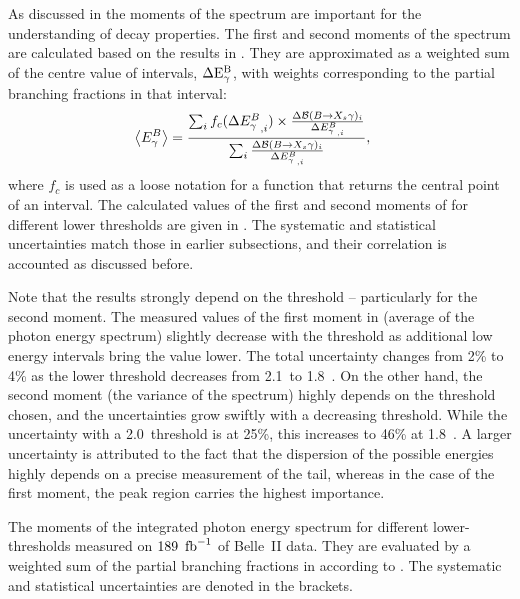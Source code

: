 As discussed in  the moments of the \BtoXsgamma
spectrum are important for the understanding of \BtoXsgamma decay properties.
The first and second moments of the \BtoXsgamma spectrum are calculated based on the results in .
They are approximated as a weighted sum of the centre value of \EB intervals, $\mathrm{\Delta{\ensuremath{E^B_{\gamma}}}}$,
with weights corresponding to the partial branching fractions in that \EB interval:
\begin{align}\label{eq:weighted_sum_moments}
    \begin{split}
        \expval{\EB} &= \frac{\sum_i f_c(\Delta\EB^{}_{,i})\times  
                               \frac{\Delta\mathcal{B}(\BtoXsgamma)_i}
                                    {\Delta {E^B_{\g}}_{,i}}}
                             {\sum_i \frac{\Delta\mathcal{B}(\BtoXsgamma)_i}{\Delta {E^B_{\g}}_{,i}}},
    \end{split}
\end{align} 
where $f_c$ is used as a loose notation for a function that returns the central point of an interval.
The calculated values of the first and second moments of \EB for different lower thresholds are given in .
The systematic and statistical uncertainties match those in earlier subsections, and their correlation is accounted as discussed before.

Note that the results strongly depend on the threshold -- particularly for the second moment.
The measured values of the first moment in  (average of the photon energy spectrum) slightly decrease with the \EB threshold as additional
low energy \EB intervals bring the value lower.
The total uncertainty changes from 2\% to 4\% as the \EB lower threshold decreases from 2.1~\gev to 1.8~\gev.
On the other hand, the second moment (the variance of the spectrum) highly depends on the threshold chosen, 
and the uncertainties grow swiftly with a decreasing \EB threshold.
While the uncertainty with a 2.0~\gev \EB threshold is at 25\%, this increases to 46\% at 1.8~\gev.
A larger uncertainty is attributed to the fact that the dispersion of the possible \EB energies highly depends on a precise measurement of the tail,
whereas in the case of the first moment, the peak region carries the highest importance.


\begin{table}[htbp!]
    \centering
    \caption{\label{tab:moments}
    The moments of the integrated \BtoXsgamma photon energy spectrum for different lower-\EB thresholds measured on $189~\mbox{\,fb}^{-1}$ of Belle~II data.
    They are evaluated by a weighted sum of the partial branching fractions in  according to .
    The systematic and statistical uncertainties are denoted in the brackets.
    }
    
\end{table}
